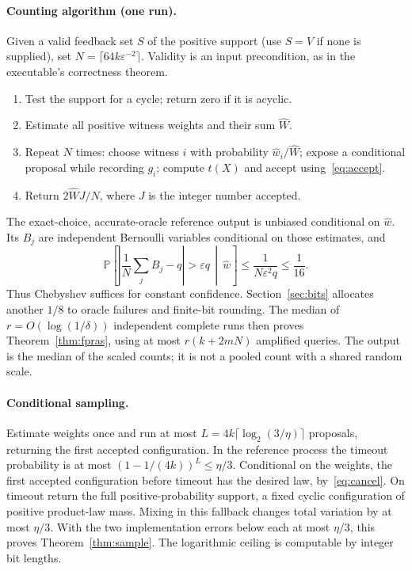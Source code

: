 \documentclass[11pt]{article}
\newcommand{\Prb}{\mathbb{P}}
\begin{document}
\paragraph{Counting algorithm (one run).}
Given a valid feedback set $S$ of the positive support (use $S=V$ if none
is supplied), set $N=\lceil64k\varepsilon^{-2}\rceil$.
Validity is an input precondition, as in the executable's correctness theorem.
\begin{enumerate}
\item Test the support for a cycle; return zero if it is acyclic.
\item Estimate all positive witness weights and their sum $\widehat W$.
\item Repeat $N$ times: choose witness $i$ with probability
      $\widehat w_i/\widehat W$; expose a conditional proposal while recording
      $g_i$; compute $t(X)$ and accept using~\eqref{eq:accept}.
\item Return $2\widehat W J/N$, where $J$ is the integer number accepted.
\end{enumerate}
The exact-choice, accurate-oracle reference output is unbiased conditional
on $\widehat w$. Its $B_j$ are independent Bernoulli variables conditional
on those estimates, and
\[
 \Prb\left[\left|\frac1N\sum_jB_j-q\right|>\varepsilon q
       \,\middle|\,\widehat w\right]
 \leq\frac1{N\varepsilon^2q}\leq\frac1{16}.
\]
Thus Chebyshev suffices for constant confidence. Section~\ref{sec:bits}
allocates another $1/8$ to oracle failures and finite-bit rounding.
The median of $r=O(\log(1/\delta))$ independent complete runs then proves
Theorem~\ref{thm:fpras}, using at most $r(k+2mN)$ amplified queries.
The output is the median of the scaled counts; it is not a pooled count
with a shared random scale.

\paragraph{Conditional sampling.}
Estimate weights once and run at most
$L=4k\lceil\log_2(3/\eta)\rceil$ proposals, returning the first accepted
configuration. In the reference process the timeout probability is at most
$(1-1/(4k))^L\leq\eta/3$. Conditional on the weights, the first accepted
configuration before timeout has the desired law, by~\eqref{eq:cancel}.
On timeout return the full positive-probability support, a fixed cyclic
configuration of positive product-law mass.
Mixing in this fallback changes total variation by at most $\eta/3$.
With the two implementation errors below each at most $\eta/3$, this proves
Theorem~\ref{thm:sample}. The logarithmic ceiling is computable by integer
bit lengths.
\end{document}
